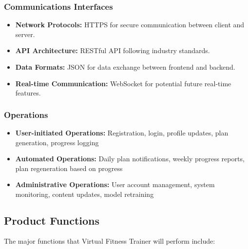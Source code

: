 \documentclass[12pt,a4paper]{article}
\begin{document}
\subsubsection{Communications Interfaces}
\begin{itemize}
    \item \textbf{Network Protocols:} HTTPS for secure communication between client and server.
    \item \textbf{API Architecture:} RESTful API following industry standards.
    \item \textbf{Data Formats:} JSON for data exchange between frontend and backend.
    \item \textbf{Real-time Communication:} WebSocket for potential future real-time features.
\end{itemize}

\subsubsection{Operations}
\begin{itemize}
    \item \textbf{User-initiated Operations:} Registration, login, profile updates, plan generation, progress logging
    \item \textbf{Automated Operations:} Daily plan notifications, weekly progress reports, plan regeneration based on progress
    \item \textbf{Administrative Operations:} User account management, system monitoring, content updates, model retraining
\end{itemize}

\subsection{Product Functions}
The major functions that Virtual Fitness Trainer will perform include:
\end{document}
